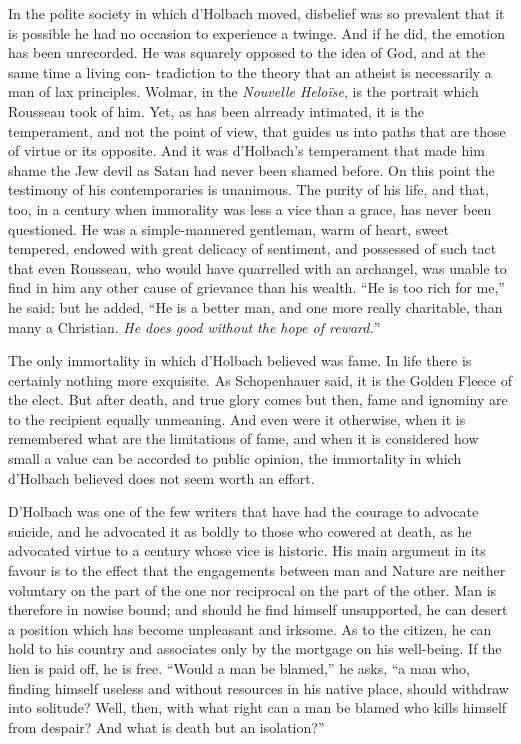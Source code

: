\documentclass[]{book}
\begin{document}
In the polite society in which d'Holbach moved, disbelief was so
prevalent that it is possible he had no occasion to experience a twinge.
And if he did, the emotion has been unrecorded. He was squarely opposed
to the idea of God, and at the same time a living con- tradiction to the
theory that an atheist is necessarily a man of lax principles. Wolmar,
in the \emph{Nouvelle Heloïse}, is the portrait which Rousseau took of
him. Yet, as has been alrready intimated, it is the temperament, and not
the point of view, that guides us into paths that are those of virtue or
its opposite. And it was d'Holbach's temperament that made him shame the
Jew devil as Satan had never been shamed before. On this point the
testimony of his contemporaries is unanimous. The purity of his life,
and that, too, in a century when immorality was less a vice than a
grace, has never been questioned. He was a simple-mannered gentleman,
warm of heart, sweet tempered, endowed with great delicacy of sentiment,
and possessed of such tact that even Rousseau, who would have quarrelled
with an archangel, was unable to find in him any other cause of
grievance than his wealth. ``He is too rich for me,'' he said; but he
added, ``He is a better man, and one more really charitable, than many a
Christian. \emph{He does good without the hope of reward.}''

The only immortality in which d'Holbach believed was fame. In life there
is certainly nothing more exquisite. As Schopenhauer said, it is the
Golden Fleece of the elect. But after death, and true glory comes but
then, fame and ignominy are to the recipient equally unmeaning. And even
were it otherwise, when it is remembered what are the limitations of
fame, and when it is considered how small a value can be accorded to
public opinion, the immortality in which d'Holbach believed does not
seem worth an effort.

D'Holbach was one of the few writers that have had the courage to
advocate suicide, and he advocated it as boldly to those who cowered at
death, as he advocated virtue to a century whose vice is historic. His
main argument in its favour is to the effect that the engagements
between man and Nature are neither voluntary on the part of the one nor
reciprocal on the part of the other. Man is therefore in nowise bound;
and should he find himself unsupported, he can desert a position which
has become unpleasant and irksome. As to the citizen, he can hold to his
country and associates only by the mortgage on his well-being. If the
lien is paid off, he is free. ``Would a man be blamed,'' he asks, ``a
man who, finding himself useless and without resources in his native
place, should withdraw into solitude? Well, then, with what right can a
man be blamed who kills himself from despair? And what is death but an
isolation?''
\end{document}
